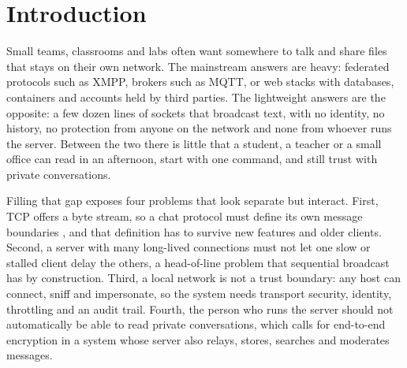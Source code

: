 \documentclass[conference]{IEEEtran}
\begin{document}
\section{Introduction}\label{sec:intro}
Small teams, classrooms and labs often want somewhere to talk and share files that stays on their own network. The mainstream answers are heavy: federated protocols such as XMPP, brokers such as MQTT, or web stacks with databases, containers and accounts held by third parties. The lightweight answers are the opposite: a few dozen lines of sockets that broadcast text, with no identity, no history, no protection from anyone on the network and none from whoever runs the server. Between the two there is little that a student, a teacher or a small office can read in an afternoon, start with one command, and still trust with private conversations.

Filling that gap exposes four problems that look separate but interact. First, TCP offers a byte stream, so a chat protocol must define its own message boundaries \cite{rfc9293,stevens}, and that definition has to survive new features and older clients. Second, a server with many long-lived connections must not let one slow or stalled client delay the others, a head-of-line problem that sequential broadcast has by construction. Third, a local network is not a trust boundary: any host can connect, sniff and impersonate, so the system needs transport security, identity, throttling and an audit trail. Fourth, the person who runs the server should not automatically be able to read private conversations, which calls for end-to-end encryption in a system whose server also relays, stores, searches and moderates messages.
\end{document}
